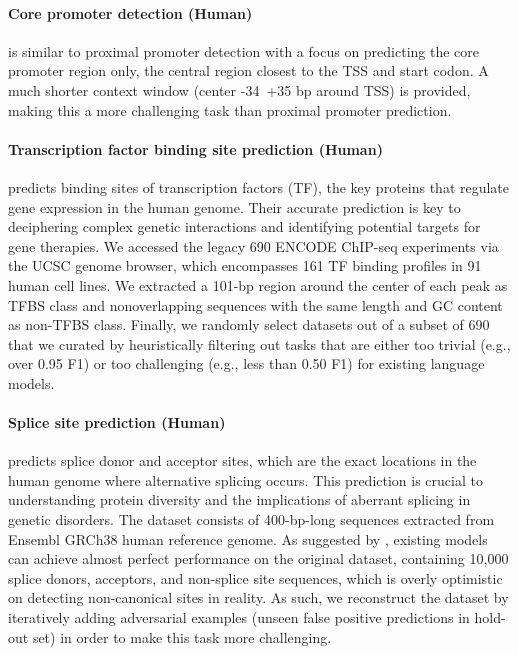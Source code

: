 \documentclass{article}
\begin{document}
\paragraph{Core promoter detection (Human)} is similar to proximal promoter detection with a focus on predicting the core promoter region only, the central region closest to the TSS and start codon. A much shorter context window (center -34~+35 bp around TSS) is provided, making this a more challenging task than proximal promoter prediction. 



\paragraph{Transcription factor binding site prediction (Human)}  predicts binding sites of transcription factors (TF), the key proteins that regulate gene expression in the human genome. Their accurate prediction is key to deciphering complex genetic interactions and identifying potential targets for gene therapies. We accessed the legacy 690 ENCODE ChIP-seq experiments \citep{encode2012integrated} via the UCSC genome browser, which encompasses 161 TF binding profiles in 91 human cell lines. We extracted a 101-bp region around the center of each peak as TFBS class and nonoverlapping sequences with the same length and GC content as non-TFBS class. Finally, we randomly select  datasets out of a subset of 690 that we curated by heuristically filtering out tasks that are either too trivial (e.g., over 0.95 F1) or too challenging (e.g., less than 0.50 F1) for existing language models.


\paragraph{Splice site prediction (Human)} predicts splice donor and acceptor sites, which are the exact locations in the human genome where alternative splicing occurs. This prediction is crucial to understanding protein diversity and the implications of aberrant splicing in genetic disorders. The dataset \citep{wang2019splicefinder} consists of 400-bp-long sequences extracted from Ensembl GRCh38 human reference genome. As suggested by \citet{dnabert}, existing models can achieve almost perfect performance on the original dataset, containing 10,000 splice donors, acceptors, and non-splice site sequences, which is overly optimistic on detecting non-canonical sites in reality. As such, we reconstruct the dataset by iteratively adding adversarial examples (unseen false positive predictions in hold-out set) in order to make this task more challenging.  
\end{document}
